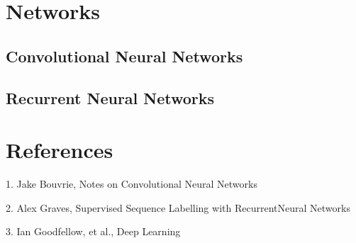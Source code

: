 \documentclass[9pt,twocolumn,times]{article}
\begin{document}
\section{Networks}

\subsection{Convolutional Neural Networks}

\subsection{Recurrent Neural Networks}

\section*{References}

1. Jake Bouvrie, Notes on Convolutional Neural Networks

2. Alex Graves, Supervised Sequence Labelling with RecurrentNeural Networks

3. Ian Goodfellow, et al., Deep Learning
\end{document}
